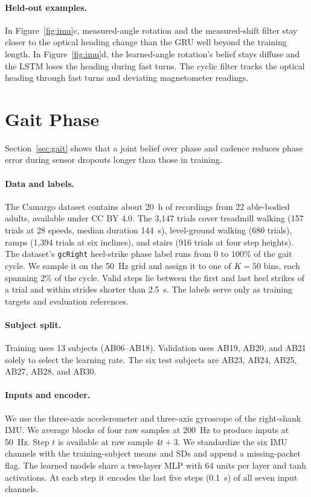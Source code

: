 \paragraph{Held-out examples.}
In Figure~\ref{fig:imu}c, measured-angle rotation and the measured-shift
filter stay closer to the optical heading change than the GRU well beyond
the training length. In Figure~\ref{fig:imu}d, the learned-angle rotation's
belief stays diffuse and the LSTM loses the heading during fast turns.
The cyclic filter tracks the optical heading through fast turns and
deviating magnetometer readings.

\FloatBarrier
\section{Gait Phase}
\label{app:gait}
Section~\ref{sec:gait} shows that a joint belief over phase and cadence
reduces phase error during sensor dropouts longer than those in training.

\paragraph{Data and labels.}
The Camargo dataset \citep{camargo2021dataset} contains about 20~h of
recordings from 22 able-bodied adults, available under CC BY 4.0. The 3,147
trials cover treadmill walking (157 trials at 28 speeds, median duration
144~s), level-ground walking (680 trials), ramps (1,394 trials at six
inclines), and stairs (916 trials at four step heights). The dataset's
\texttt{gcRight} heel-strike phase label runs from 0 to $100\%$ of the gait
cycle. We sample it on the 50~Hz grid and assign it to one of $K=50$ bins,
each spanning $2\%$ of the cycle. Valid steps lie between the first and last
heel strikes of a trial and within strides shorter than 2.5~s. The labels
serve only as training targets and evaluation references.

\paragraph{Subject split.}
Training uses 13 subjects (AB06--AB18). Validation uses AB19, AB20, and AB21
solely to select the learning rate. The six test subjects are AB23, AB24,
AB25, AB27, AB28, and AB30.

\paragraph{Inputs and encoder.}
We use the three-axis accelerometer and three-axis gyroscope of the right-shank
IMU. We average blocks of four raw samples at 200~Hz to produce inputs at
50~Hz. Step $t$ is available at raw sample $4t+3$. We standardize the six IMU
channels with the training-subject means and SDs and append a missing-packet
flag. The learned models share a two-layer MLP with 64 units per layer and
tanh activations. At each step it encodes the last five steps (0.1~s) of all
seven input channels.

